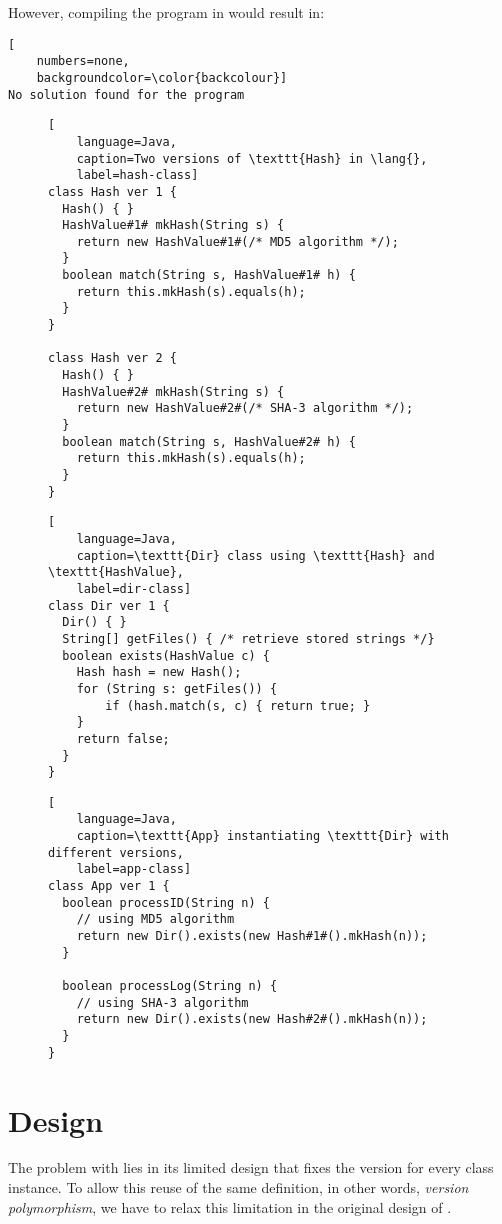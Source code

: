 However, compiling the program in \lang{} would result in:
\begin{lstlisting}[
    numbers=none,
    backgroundcolor=\color{backcolour}]
No solution found for the program
\end{lstlisting}


\begin{figure}[t]
\begin{lstlisting}[
    language=Java,
    caption=Two versions of \texttt{Hash} in \lang{},
    label=hash-class]
class Hash ver 1 {
  Hash() { }
  HashValue#1# mkHash(String s) {
    return new HashValue#1#(/* MD5 algorithm */);
  }
  boolean match(String s, HashValue#1# h) {
    return this.mkHash(s).equals(h);
  }
}

class Hash ver 2 {
  Hash() { }
  HashValue#2# mkHash(String s) {
    return new HashValue#2#(/* SHA-3 algorithm */);
  }
  boolean match(String s, HashValue#2# h) {
    return this.mkHash(s).equals(h);
  }
}
\end{lstlisting}

\begin{lstlisting}[
    language=Java,
    caption=\texttt{Dir} class using \texttt{Hash} and \texttt{HashValue},
    label=dir-class]
class Dir ver 1 {
  Dir() { }
  String[] getFiles() { /* retrieve stored strings */}
  boolean exists(HashValue c) {
    Hash hash = new Hash();
    for (String s: getFiles()) {
        if (hash.match(s, c) { return true; }
    }
    return false;
  }
}
\end{lstlisting}
\end{figure}

\begin{figure}[h!]
\begin{lstlisting}[
    language=Java,
    caption=\texttt{App} instantiating \texttt{Dir} with different versions,
    label=app-class]
class App ver 1 {
  boolean processID(String n) {
    // using MD5 algorithm
    return new Dir().exists(new Hash#1#().mkHash(n));
  }

  boolean processLog(String n) {
    // using SHA-3 algorithm
    return new Dir().exists(new Hash#2#().mkHash(n));
  }
}
\end{lstlisting}
\end{figure}

\section{Design}

The problem with \lang{} lies in its limited design that fixes the version for every class instance. To allow this reuse of 
the same definition, in other words, \emph{version polymorphism}, we have to relax this limitation in the original design of \lang{}.

